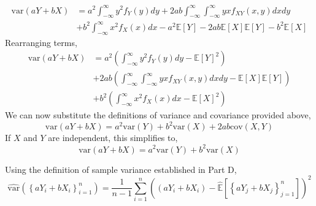 \documentclass[12pt,twoside]{article}
\begin{document}
\begin{problems}
\begin{problemparts}
\begin{align*}
    \mathrm{var}(aY + bX) &= a^2 \int_{-\infty}^{\infty} y^2 f_{Y}(y) dy + 2ab
    \int_{-\infty}^{\infty}\int_{-\infty}^{\infty} yx f_{XY}(x, y) dx dy \\
    &+ b^2 \int_{-\infty}^{\infty} x^2 f_{X}(x) dx - a^2 \mathbb{E}[Y] - 2ab
    \mathbb{E}[X] \mathbb{E}[Y] - b^2 \mathbb{E}[X]
\end{align*}
Rearranging terms,
\begin{align*}
    \mathrm{var}(aY + bX) &= a^2 \left(\int_{-\infty}^{\infty} y^2 f_{Y}(y) dy - 
    \mathbb{E}[Y]^2\right) \\
    &+  2ab \left(\int_{-\infty}^{\infty}\int_{-\infty}^{\infty} yx f_{XY}(x, y) 
    dx dy - \mathbb{E}[X] \mathbb{E}[Y]\right) \\
    &+ b^2 \left(\int_{-\infty}^{\infty} x^2 f_{X}(x) dx - \mathbb{E}[X]^2\right)
\end{align*}
We can now substitute the definitions of variance and covariance provided above,
$$ \boxed{\mathrm{var}(aY + bX) = a^2 \mathrm{var}(Y) + b^2 \mathrm{var}(X) + 2ab
\mathrm{cov}(X, Y)} $$
If $X$ and $Y$ are independent, this simplifies to,
$$ \mathrm{var}(aY + bX) = a^2 \mathrm{var}(Y) + b^2 \mathrm{var}(X) $$

\problempart %

Using the definition of sample variance established in Part D,
$$ \hat{\mathrm{var}}\left(\left\{aY_i + bX_i\right\}_{i = 1}^n\right) = \frac{1}
{n - 1} \sum_{i = 1}^n \left( (aY_i + bX_i) - \hat{\mathbb{E}}\left[\left\{aY_j + 
bX_j\right\}_{j = 1}^n\right]\right)^2 $$


\end{problemparts}
\end{problems}
\end{document}
